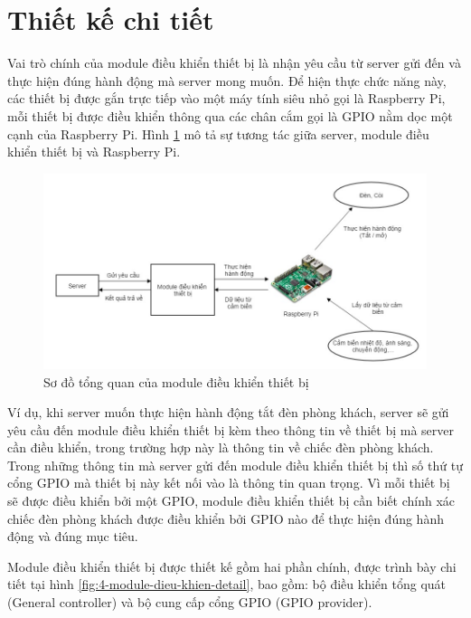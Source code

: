 \documentclass[12pt,a4paper,oneside]{extbook}
\begin{document}
\section{Thiết kế chi tiết}

Vai trò chính của module điều khiển thiết bị là nhận yêu cầu từ server gửi đến và thực hiện đúng hành động mà server mong muốn. Để hiện thực chức năng này, các thiết bị được gắn trực tiếp vào một máy tính siêu nhỏ gọi là Raspberry Pi, mỗi thiết bị được điều khiển thông qua các chân cắm gọi là GPIO nằm dọc một cạnh của Raspberry Pi. Hình \ref{fig:4-module-dieu-khien-overview} mô tả sự tương tác giữa server, module điều khiển thiết bị và Raspberry Pi.

\begin{figure}[h]
  \centering
     \includegraphics[scale=0.5]{4-module-dieu-khien-overview}
  \caption{Sơ đồ tổng quan của module điều khiển thiết bị}\label{fig:4-module-dieu-khien-overview}
\end{figure}

Ví dụ, khi server muốn thực hiện hành động tắt đèn phòng khách, server sẽ gửi yêu cầu đến module điều khiển thiết bị kèm theo thông tin về thiết bị mà server cần điều khiển, trong trường hợp này là thông tin về chiếc đèn phòng khách. Trong những thông tin mà server gửi đến module điều khiển thiết bị thì số thứ tự cổng GPIO mà thiết bị này kết nối vào là thông tin quan trọng. Vì mỗi thiết bị sẽ được điều khiển bởi một GPIO, module điều khiển thiết bị cần biết chính xác chiếc đèn phòng khách được điều khiển bởi GPIO nào để thực hiện đúng hành động và đúng mục tiêu.

Module điều khiển thiết bị được thiết kế gồm hai phần chính, được trình bày chi tiết tại hình \ref{fig:4-module-dieu-khien-detail}, bao gồm: bộ điều khiển tổng quát (General controller) và bộ cung cấp cổng GPIO (GPIO provider).
\end{document}
